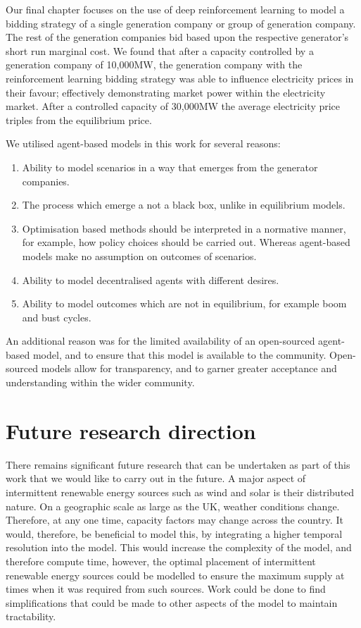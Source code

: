 Our final chapter focuses on the use of deep reinforcement learning to model a bidding strategy of a single generation company or group of generation company. The rest of the generation companies bid based upon the respective generator's short run marginal cost. We found that after a capacity controlled by a generation company of 10,000MW, the generation company with the reinforcement learning bidding strategy was able to influence electricity prices in their favour; effectively demonstrating market power within the electricity market. After a controlled capacity of 30,000MW the average electricity price triples from the equilibrium price. 

We utilised agent-based models in this work for several reasons:
\begin{enumerate}
	\item Ability to model scenarios in a way that emerges from the generator companies.
	\item The process which emerge a not a black box, unlike in equilibrium models.
	\item Optimisation based methods should be interpreted in a normative manner, for example, how policy choices should be carried out. Whereas agent-based models make no assumption on outcomes of scenarios.
	\item Ability to model decentralised agents with different desires.
	\item Ability to model outcomes which are not in equilibrium, for example boom and bust cycles.
\end{enumerate}

An additional reason was for the limited availability of an open-sourced agent-based model, and to ensure that this model is available to the community. Open-sourced models allow for transparency, and to garner greater acceptance and understanding within the wider community. 


\section{Future research direction}

There remains significant future research that can be undertaken as part of this work that we would like to carry out in the future. A major aspect of intermittent renewable energy sources such as wind and solar is their distributed nature. On a geographic scale as large as the UK, weather conditions change. Therefore, at any one time, capacity factors may change across the country. It would, therefore, be beneficial to model this, by integrating a higher temporal resolution into the model. This would increase the complexity of the model, and therefore compute time, however, the optimal placement of intermittent renewable energy sources could be modelled to ensure the maximum supply at times when it was required from such sources. Work could be done to find simplifications that could be made to other aspects of the model to maintain tractability. 

